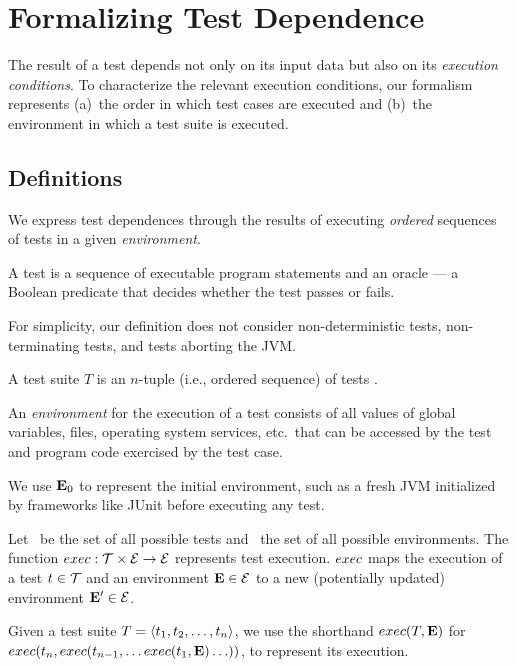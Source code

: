 
\section{Formalizing Test Dependence}
\label{sec:formalism}


The result of a test depends not only on
its input data but also on its \emph{execution conditions}.
To characterize the relevant execution conditions, 
our formalism represents
(a)~the order in which test cases are executed and (b)~the environment in which a test suite is executed.  


\subsection{Definitions}
\label{sec:definitions}

We express test dependences through the results of executing
\emph{ordered} sequences of tests in a given \emph{environment}.


\begin{definition}[Test]

A test is a sequence of executable program statements and an oracle
--- a Boolean predicate that
decides whether the test passes or fails.
\end{definition}

For simplicity, our definition does not consider non-deter\-min\-istic
tests, non-terminating tests, and tests aborting the JVM\@.


\begin{definition}
A test suite\/ $T$ is an $n$-tuple (i.e., ordered sequence) of tests
.

\end{definition}


\begin{definition}[Environment]
An \emph{environment} \env for the execution of a test
consists of all values of global variables, files,
operating
system services, etc.\ that
can be accessed by the test and program code exercised by the test
case.
\end{definition}

We use $\mathbf{E}_0$ to represent the initial environment, such
as a fresh JVM initialized by frameworks like JUnit
before executing any test.


\begin{definition}
Let\/ \alltests\ be the set of all possible
tests and\/ \environs\ the set of all possible
environments.
The function\/ $exec: \mathcal{T} \times \mathcal{E} \rightarrow
\mathcal{E}$ represents test
execution. $exec$ maps the execution of a test\/ $ t \in
\mathcal{T}$ 
and an environment\/ $\mathbf{E} \in \mathcal{E}$ to a new (potentially updated)
environment\/ $\mathbf{E}' \in \mathcal{E}$.

Given a test suite\/ $T =  \langle t_1, t_2, \dots, t_n \rangle $,
we use the shorthand\/
$exec(T,\mathbf{E})$ for $exec(t_n,exec(t_{n-1},{\dots exec(t_1,\mathbf{E}) \dots }))$, to represent its execution.
\end{definition}

